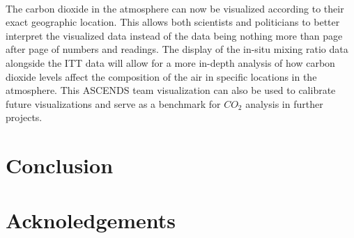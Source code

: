 \documentclass[12pt,letterpaper]{report}
\begin{document}
  \paragraph{}
   The carbon dioxide in the atmosphere can now be visualized according to their exact geographic location. This allows both scientists and politicians to better interpret the visualized data instead of the data being nothing more than page after page of numbers and readings. The display of the in-situ mixing ratio data alongside the ITT data will allow for a more in-depth analysis of how carbon dioxide levels affect the composition of the air in specific locations in the atmosphere. This ASCENDS team visualization can also be used to calibrate future visualizations and serve as a benchmark for $CO_2$ analysis in further projects.
 \section*{Conclusion}

 \section*{Acknoledgements}
\end{document}
